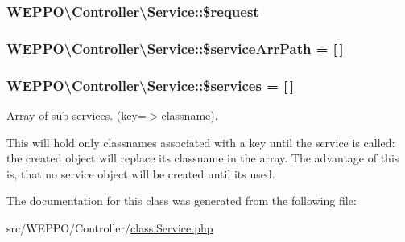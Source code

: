 \subsubsection[{\texorpdfstring{\$request}{$request}}]{\setlength{\rightskip}{0pt plus 5cm}W\+E\+P\+P\+O\textbackslash{}\+Controller\textbackslash{}\+Service\+::\$request\hspace{0.3cm}{\ttfamily [protected]}}\hypertarget{classWEPPO_1_1Controller_1_1Service_aab9a070609bf114a6d53c8c4259b4401}{}\label{classWEPPO_1_1Controller_1_1Service_aab9a070609bf114a6d53c8c4259b4401}
\subsubsection[{\texorpdfstring{\$service\+Arr\+Path}{$serviceArrPath}}]{\setlength{\rightskip}{0pt plus 5cm}W\+E\+P\+P\+O\textbackslash{}\+Controller\textbackslash{}\+Service\+::\$service\+Arr\+Path = \mbox{[}$\,$\mbox{]}\hspace{0.3cm}{\ttfamily [protected]}}\hypertarget{classWEPPO_1_1Controller_1_1Service_a866d6d4731f3e15041a73e551fef847d}{}\label{classWEPPO_1_1Controller_1_1Service_a866d6d4731f3e15041a73e551fef847d}
\subsubsection[{\texorpdfstring{\$services}{$services}}]{\setlength{\rightskip}{0pt plus 5cm}W\+E\+P\+P\+O\textbackslash{}\+Controller\textbackslash{}\+Service\+::\$services = \mbox{[}$\,$\mbox{]}\hspace{0.3cm}{\ttfamily [protected]}}\hypertarget{classWEPPO_1_1Controller_1_1Service_a5b64c7141eebd4233342985ee9eca236}{}\label{classWEPPO_1_1Controller_1_1Service_a5b64c7141eebd4233342985ee9eca236}
Array of sub services. (key=$>$classname).

This will hold only classnames associated with a key until the service is called\+: the created object will replace its classname in the array. The advantage of this is, that no service object will be created until its used. 

The documentation for this class was generated from the following file\+:\begin{DoxyCompactItemize}
\item 
src/\+W\+E\+P\+P\+O/\+Controller/\hyperlink{class_8Service_8php}{class.\+Service.\+php}\end{DoxyCompactItemize}
